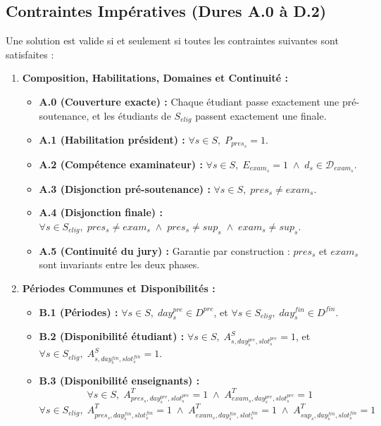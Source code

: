 \documentclass[10pt,a4paper]{article}
\begin{document}
\subsection{Contraintes Impératives (Dures A.0 à D.2)}
Une solution est valide si et seulement si toutes les contraintes suivantes sont satisfaites :
\begin{enumerate}
    \item \textbf{Composition, Habilitations, Domaines et Continuité :}
    \begin{itemize}
        \item \textbf{A.0 (Couverture exacte) :} Chaque étudiant passe exactement une pré-soutenance, et les étudiants de $S_{elig}$ passent exactement une finale.
        \item \textbf{A.1 (Habilitation président) :} $\forall s \in S, \; P_{pres_s} = 1$.
        \item \textbf{A.2 (Compétence examinateur) :} $\forall s \in S, \; E_{exam_s} = 1 \;\land\; d_s \in \mathcal{D}_{exam_s}$.
        \item \textbf{A.3 (Disjonction pré-soutenance) :} $\forall s \in S, \; pres_s \neq exam_s$.
        \item \textbf{A.4 (Disjonction finale) :} $\forall s \in S_{elig}, \; pres_s \neq exam_s \;\land\; pres_s \neq sup_s \;\land\; exam_s \neq sup_s$.
        \item \textbf{A.5 (Continuité du jury) :} Garantie par construction : $pres_s$ et $exam_s$ sont invariants entre les deux phases.
    \end{itemize}
    \item \textbf{Périodes Communes et Disponibilités :}
    \begin{itemize}
        \item \textbf{B.1 (Périodes) :} $\forall s \in S, \; day^{pre}_s \in D^{pre}$, et $\forall s \in S_{elig}, \; day^{fin}_s \in D^{fin}$.
        \item \textbf{B.2 (Disponibilité étudiant) :} $\forall s \in S, \; A^S_{s, day^{pre}_s, slot^{pre}_s} = 1$, et $\forall s \in S_{elig}, \; A^S_{s, day^{fin}_s, slot^{fin}_s} = 1$.
        \item \textbf{B.3 (Disponibilité enseignants) :}
        $$\forall s \in S, \; A^T_{pres_s, day^{pre}_s, slot^{pre}_s} = 1 \;\land\; A^T_{exam_s, day^{pre}_s, slot^{pre}_s} = 1$$
        $$\forall s \in S_{elig}, \; A^T_{pres_s, day^{fin}_s, slot^{fin}_s} = 1 \;\land\; A^T_{exam_s, day^{fin}_s, slot^{fin}_s} = 1 \;\land\; A^T_{sup_s, day^{fin}_s, slot^{fin}_s} = 1$$

\end{itemize}
\end{enumerate}
\end{document}

